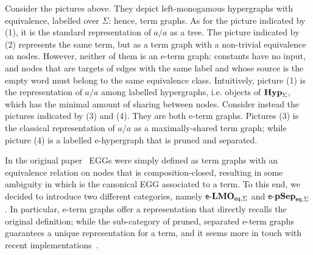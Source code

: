 \documentclass[3p]{elsarticle}
\newcommand{\eq}{\mathsf{eq}}
\newcommand{\catname}[1]{\textbf{\textup{#1}}}
\newcommand{\hyps}{\catname{Hyp}_{\Sigma}}
\newcommand{\Eqhyps}{\catname{Hyp}_{\mathsf{eq}, \Sigma}}
\newcommand{\lelmBis}{\mathsf{e}\text{-}\catname{LMO}_{\eq, \Sigma}}
\newcommand{\lepsBis}{\mathsf{e}\text{-}\catname{pSep}_{\eq, \Sigma}}
\theoremstyle{remark}
\theoremstyle{definition}
\begin{document}
\begin{center}
\end{center}

Consider the pictures above.
They depict left-monogamous hypergraphs with equivalence, labelled over 
$\Sigma$: hence, term graphs.
%
As for the picture indicated by (1), it is the standard representation of $a / a$ as a tree. 
%
The picture indicated by (2) represents the same term, but as a term graph with a non-trivial equivalence on nodes.
However, neither of them is an e-term graph:
constants have no input, and nodes that are targets of edges with the same label and whose source is the empty word 
must belong to the same equivalence class. Intuitively, picture (1) is the representation of $a / a$ 
among labelled hypergraphs, i.e. objects of $\hyps$, which has the minimal amount of sharing between nodes.
%
Consider instead the pictures indicated by (3) and (4). They are both e-term graphs. Pictures (3) is the classical representation 
of $a / a$ as a maximally-shared term graph; while picture (4) is 
a labelled e-hypergraph that is pruned and separated.

In the original paper~\cite{DetlefsNS05} EGGs were simply defined as term graphs with an equivalence relation on nodes that is composition-closed, 
resulting in some ambiguity in which is the canonical EGG associated to a term. To this end, we decided to introduce two different categories,
namely $\lelmBis$ and $\lepsBis$.
In particular, e-term graphs offer a representation that directly recalls the original definition; while the sub-category of pruned, separated 
e-term graphs guarantees a unique representation for a term, and it seems more in touch with recent implementations~\cite{eggs}.
\end{document}
